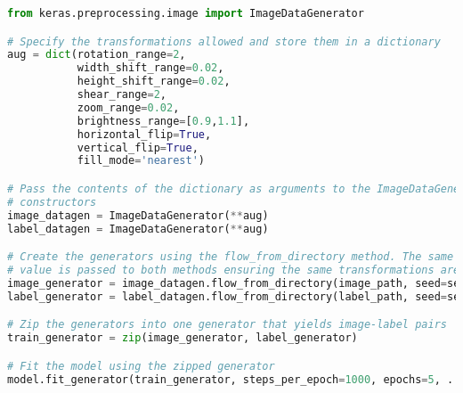 \begin{lstlisting}[float={t},caption={A simplified example of online augmentation implemented using the \texttt{ImageDataGenerator} class. The model is then trained for five epochs with each epoch consisting of 1000 training samples.},label={lst:augment},language=Python,upquote=true]
from keras.preprocessing.image import ImageDataGenerator

# Specify the transformations allowed and store them in a dictionary
aug = dict(rotation_range=2,
           width_shift_range=0.02,
           height_shift_range=0.02,
           shear_range=2,
           zoom_range=0.02,
           brightness_range=[0.9,1.1],
           horizontal_flip=True,
           vertical_flip=True,
           fill_mode='nearest')

# Pass the contents of the dictionary as arguments to the ImageDataGenerator
# constructors
image_datagen = ImageDataGenerator(**aug)
label_datagen = ImageDataGenerator(**aug)

# Create the generators using the flow_from_directory method. The same seed
# value is passed to both methods ensuring the same transformations are applied.
image_generator = image_datagen.flow_from_directory(image_path, seed=seed, ...)
label_generator = label_datagen.flow_from_directory(label_path, seed=seed, ...)

# Zip the generators into one generator that yields image-label pairs
train_generator = zip(image_generator, label_generator)

# Fit the model using the zipped generator
model.fit_generator(train_generator, steps_per_epoch=1000, epochs=5, ...)
\end{lstlisting}